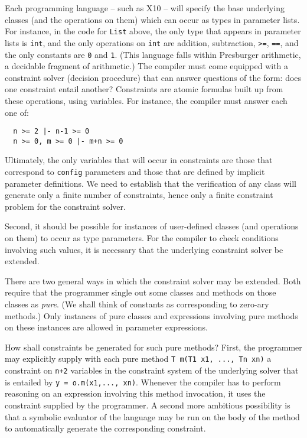 \documentclass[fullpage]{article}
\def\Xten{{\sf X10}}
\begin{document}
Each programming language -- such as \Xten{} -- will specify the base
underlying classes (and the operations on them) which can occur as
types in parameter lists. For instance, in the code for {\tt List}
above, the only type that appears in parameter lists is {\tt int}, and
the only operations on {\tt int} are addition, subtraction, {\tt >=},
{\tt ==}, and the only constants are {\tt 0} and {\tt 1}.  (This
language falls within Presburger arithmetic, a decidable fragment of
arithmetic.)  The compiler must come equipped with a constraint solver
(decision procedure) that can answer questions of the form: does one
constraint entail another?  Constraints are atomic formulas built up
from these operations, using variables. For instance, the compiler
must answer each one of:
{\footnotesize
\begin{verbatim}
  n >= 2 |- n-1 >= 0
  n >= 0, m >= 0 |- m+n >= 0
\end{verbatim}}

Ultimately, the only variables that will occur in constraints are
those that correspond to {\tt config} parameters and those that are
defined by implicit parameter definitions. We need to establish that
the verification of any class will generate only a finite number of
constraints, hence only a finite constraint problem for the constraint
solver.

Second, it should be possible for instances of user-defined classes
(and operations on them) to occur as type parameters. For the compiler
to check conditions involving such values, it is necessary that the
underlying constraint solver be extended. 

There are two general ways in which the constraint solver may be
extended.  Both require that the programmer single out some classes
and methods on those classes as {\em pure}. (We shall think of
constants as corresponding to zero-ary methods.) Only instances of
pure classes and expressions involving pure methods on these instances
are allowed in parameter expressions.

How shall constraints be generated for such pure methods? First, the
programmer may explicitly supply with each pure method {\tt T m(T1 x1,
..., Tn xn)} a constraint on {\tt n+2} variables in the constraint
system of the underlying solver that is entailed by {\tt y =
o.m(x1,..., xn)}. Whenever the compiler has to perform reasoning on an
expression involving this method invocation, it uses the constraint
supplied by the programmer. A second more ambitious possibility is
that a symbolic evaluator of the language may be run on the body of
the method to automatically generate the corresponding constraint.
\end{document}
